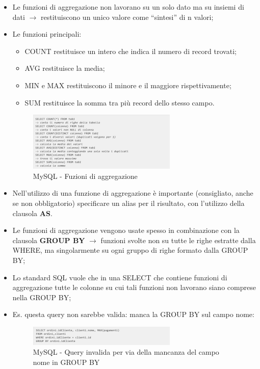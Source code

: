 \begin{itemize}

\item Le funzioni di aggregazione non lavorano su un solo dato ma su insiemi di dati $\rightarrow$ restituiscono un unico valore come “sintesi” di n valori;
\item Le funzioni principali:
\begin{itemize}

\item COUNT restituisce un intero che indica il numero di record trovati;
\item AVG restituisce la media;
\item MIN e MAX restituiscono il minore e il maggiore rispettivamente;
\item SUM restituisce la somma tra più record dello stesso campo.

\end{itemize}

\begin{center}
\begin{figure}[H]
\centering
\includegraphics[scale=1]{figures/mySQL_aggregation.png}
\caption{MySQL - Fuzioni di aggregazione} 
\end{figure}
\end{center}
\item Nell'utilizzo di una funzione di aggregazione è importante (consigliato, anche se non obbligatorio) specificare un alias per il risultato, con l'utilizzo della clausola \textbf{AS}.

\item Le funzioni di aggregazione vengono usate spesso in combinazione con la clausola \textbf{GROUP BY} $\rightarrow$ funzioni svolte non su tutte le righe estratte dalla WHERE, ma singolarmente su ogni gruppo di righe formato dalla GROUP BY;
\item Lo standard SQL vuole che in una SELECT che contiene funzioni di aggregazione tutte le colonne su cui tali funzioni non lavorano siano comprese nella GROUP BY;
\item Es. questa query non sarebbe valida: manca la GROUP BY sul campo nome:

\begin{center}
\begin{figure}[H]
\centering
\includegraphics[scale=1]{figures/mySQL_invalidquery.png}
\caption{MySQL - Query invalida per via della mancanza del campo nome in GROUP BY} 
\end{figure}
\end{center}


\end{itemize}
